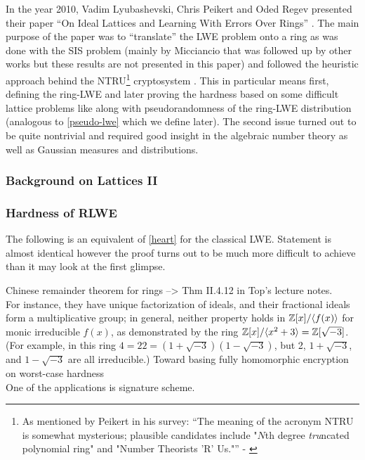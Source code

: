 In the year 2010, Vadim Lyubashevski, Chris Peikert and Oded Regev presented their paper ``On Ideal Lattices and Learning With Errors Over Rings'' \cite{ring-lwe}. The main purpose of the paper was to ``translate'' the LWE problem onto a ring as was done with the SIS problem (mainly by Micciancio \cite{ring-sis} that was followed up by other works but these results are not presented in this paper) and followed the heuristic approach behind the NTRU\footnote{As mentioned by Peikert in his survey: ``The meaning of the acronym NTRU is somewhat mysterious; plausible candidates include "$N$th degree \textit{tru}ncated polynomial ring" and "Number Theorists ’R’ Us."'' - \cite{lattice-survey}} cryptosystem \cite{ntru}. This in particular means first, defining the ring-LWE and later proving the hardness based on some difficult lattice problems like  along with pseudorandomness of the ring-LWE distribution (analogous to \ref{pseudo-lwe} which we define later). The second issue turned out to be quite nontrivial and required good insight in the algebraic number theory as well as Gaussian measures and distributions.

\subsubsection{Background on Lattices II}
\subsubsection{Hardness of RLWE}
The following is an equivalent of \ref{heart} for the classical LWE. Statement is almost identical however the proof turns out to be much more difficult to achieve than it may look at the first glimpse.
\begin{theorem}
\end{theorem}





Chinese remainder theorem for rings --> Thm II.4.12 in Top's lecture notes. \\
For instance, they have unique factorization of ideals, and their fractional ideals form a multiplicative group; in general, neither property holds in $\mathbb{Z}[x]/\langle f (x) \rangle$ for monic irreducible $f (x)$, as demonstrated by the ring $\mathbb{Z}[x]/\langle x^2+3 \rangle = \mathbb{Z}[\sqrt{-3}]$. (For example, in this ring $4 = 22 = (1+\sqrt{-3})(1 - \sqrt{-3})$, but 2, $1 + \sqrt{-3}$, and $1 - \sqrt{-3}$ are all irreducible.)
Toward basing fully homomorphic encryption on worst-case hardness \\
One of the applications is \cite{qTESLA} signature scheme.

